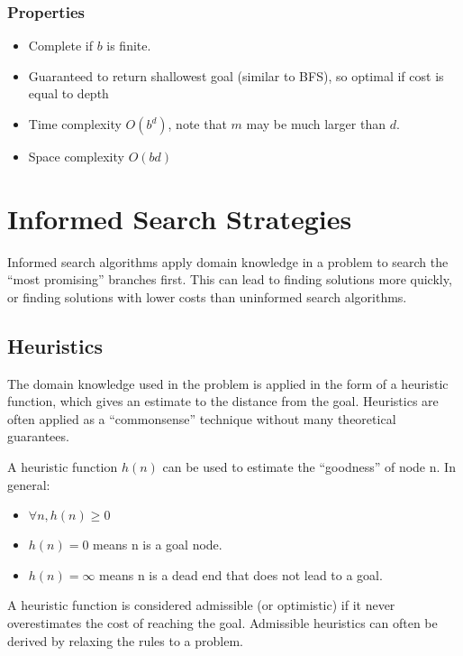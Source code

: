 \documentclass[12pt,titlepage]{article}
\begin{document}
      \subsubsection{Properties}
        \begin{itemize}
          \item Complete if $b$ is finite.
          \item Guaranteed to return shallowest goal (similar to BFS), so optimal if cost is equal to depth
          \item Time complexity $O(b^d)$, note that $m$ may be much larger than $d$.
          \item Space complexity $O(bd)$
        \end{itemize}

  \newpage

  \section{Informed Search Strategies}
    Informed search algorithms apply domain knowledge in a problem to search the ``most promising'' branches first. This can lead to
    finding solutions more quickly, or finding solutions with lower costs than uninformed search algorithms.

    \subsection{Heuristics}
      The domain knowledge used in the problem is applied in the form of a heuristic function, which gives an estimate to the distance
      from the goal. Heuristics are often applied as a ``commonsense'' technique without many theoretical guarantees.

      A heuristic function $h(n)$ can be used to estimate the ``goodness'' of node n. In general:
      \begin{itemize}
        \item $\forall n, h(n) \geq 0$
        \item $h(n) = 0$ means n is a goal node.
        \item $h(n) = \infty$ means n is a dead end that does not lead to a goal.
      \end{itemize}

      A heuristic function is considered admissible (or optimistic) if it never overestimates the cost of reaching the goal.
      Admissible heuristics can often be derived by relaxing the rules to a problem.
\end{document}

